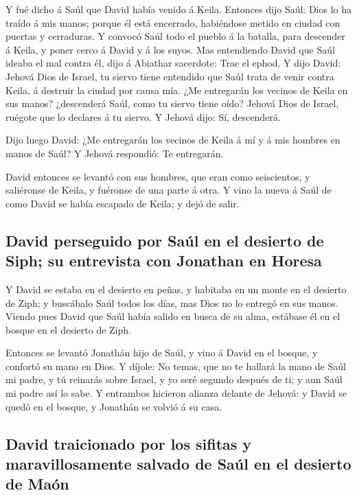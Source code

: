  Y fué dicho á Saúl que David había venido á Keila.
Entonces dijo Saúl: Dios lo ha traído á mis manos; porque él está
encerrado, habiéndose metido en ciudad con puertas y cerraduras.
 Y convocó Saúl todo el pueblo á la batalla, para
descender á Keila, y poner cerco á David y á los suyos. 
Mas entendiendo David que Saúl ideaba el mal contra él, dijo á Abiathar
sacerdote: Trae el ephod.  Y dijo David: Jehová Dios de
Israel, tu siervo tiene entendido que Saúl trata de venir contra Keila,
á destruir la ciudad por causa mía.  ¿Me entregarán los
vecinos de Keila en sus manos? ¿descenderá Saúl, como tu siervo tiene
oído? Jehová Dios de Israel, ruégote que lo declares á tu siervo. Y
Jehová dijo: Sí, descenderá.

 Dijo luego David: ¿Me entregarán los vecinos de Keila á
mí y á mis hombres en manos de Saúl? Y Jehová respondió: Te entregarán.

 David entonces se levantó con sus hombres, que eran como
seiscientos, y saliéronse de Keila, y fuéronse de una parte á otra. Y
vino la nueva á Saúl de como David se había escapado de Keila; y dejó de
salir.

\hypertarget{david-perseguido-por-sauxfal-en-el-desierto-de-siph-su-entrevista-con-jonathan-en-horesa}{%
\subsection{David perseguido por Saúl en el desierto de Siph; su
entrevista con Jonathan en
Horesa}\label{david-perseguido-por-sauxfal-en-el-desierto-de-siph-su-entrevista-con-jonathan-en-horesa}}

 Y David se estaba en el desierto en peñas, y habitaba en
un monte en el desierto de Ziph; y buscábalo Saúl todos los días, mas
Dios no lo entregó en sus manos.  Viendo pues David que
Saúl había salido en busca de su alma, estábase él en el bosque en el
desierto de Ziph.

 Entonces se levantó Jonathán hijo de Saúl, y vino á
David en el bosque, y confortó su mano en Dios.  Y
díjole: No temas, que no te hallará la mano de Saúl mi padre, y tú
reinarás sobre Israel, y yo seré segundo después de ti; y aun Saúl mi
padre así lo sabe.  Y entrambos hicieron alianza delante
de Jehová: y David se quedó en el bosque, y Jonathán se volvió á su
casa.

\hypertarget{david-traicionado-por-los-sifitas-y-maravillosamente-salvado-de-sauxfal-en-el-desierto-de-mauxf3n}{%
\subsection{David traicionado por los sifitas y maravillosamente salvado
de Saúl en el desierto de
Maón}\label{david-traicionado-por-los-sifitas-y-maravillosamente-salvado-de-sauxfal-en-el-desierto-de-mauxf3n}}

